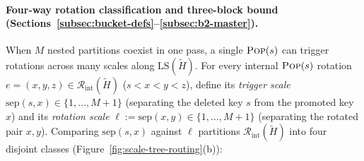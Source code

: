 \documentclass[11pt]{article}
\theoremstyle{definition}
\theoremstyle{remark}
\newcommand{\LS}{\mathrm{LS}}
\newcommand{\sep}{\mathrm{sep}}
\newcommand{\POP}{\textnormal{\scshape Pop}}
\begin{document}
\paragraph{Four-way rotation classification and three-block bound (Sections~\ref{subsec:bucket-defs}--\ref{subsec:b2-master}).}
When $M$ nested partitions coexist in one pass, a single $\POP(s)$ can trigger rotations across many scales along $\LS(\widetilde{H})$. For every internal $\POP(s)$ rotation $e = (x, y, z) \in \mathcal{R}_{\mathrm{int}}(\widetilde{H})$ ($s < x < y < z$), define its \emph{trigger scale} $\sep(s, x) \in \{1, \dots, M + 1\}$ (separating the deleted key $s$ from the promoted key $x$) and its \emph{rotation scale} $\ell := \sep(x, y) \in \{1, \dots, M + 1\}$ (separating the rotated pair $x, y$). Comparing $\sep(s, x)$ against $\ell$ partitions $\mathcal{R}_{\mathrm{int}}(\widetilde{H})$ into four disjoint classes (Figure~\ref{fig:scale-tree-routing}(b)):
\end{document}
